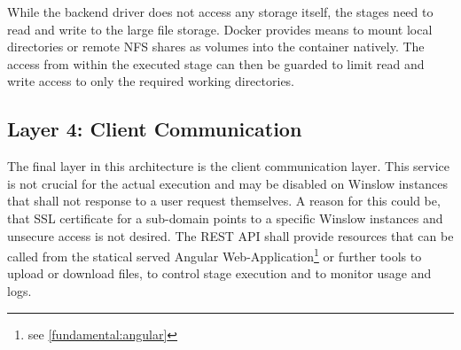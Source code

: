 While the backend driver does not access any storage itself, the stages need to read and write to the large file storage.
Docker provides means to mount local directories or remote NFS shares as volumes into the container natively.
The access from within the executed stage can then be guarded to limit read and write access to only the required working directories.

\subsection{Layer 4: Client Communication}

The final layer in this architecture is the client communication layer.
This service is not crucial for the actual execution and may be disabled on Winslow instances that shall not response to a user request themselves.
A reason for this could be, that SSL certificate for a sub-domain points to a specific Winslow instances and unsecure access is not desired.
The REST API shall provide resources that can be called from the statical served Angular Web-Application\footnote{see \autoref{fundamental:angular}} or further tools to upload or download files, to control stage execution and to monitor usage and logs.
